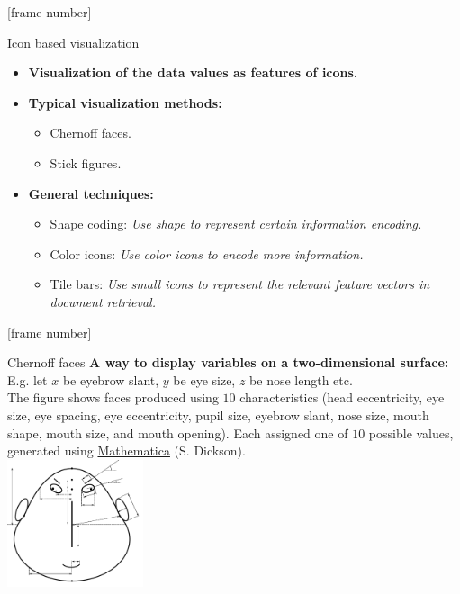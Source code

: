 \documentclass[aspectratio=169,t]{beamer}
\begin{document}
  {
    [frame number]
    \begin{frame}{Icon based visualization}
    \centering
    \begin{itemize}
      \item \textbf{Visualization of the data values as features of icons.}
      \item \textbf{Typical visualization methods:}
      \begin{itemize}
        \item Chernoff faces.
        \item Stick figures.
      \end{itemize}
      \item \textbf{General techniques:}
      \begin{itemize}
        \item Shape coding: \emph{Use shape to represent certain information encoding.}
        \item Color icons: \emph{Use color icons to encode more information.}
        \item Tile bars: \emph{Use small icons to represent the relevant feature vectors in document retrieval.}
      \end{itemize}
    \end{itemize}
    \end{frame}
  }

  {
    [frame number]
    \begin{frame}{Chernoff faces}
    \textbf{A way to display variables on a two-dimensional surface:}\\
    E.g. let $x$ be eyebrow slant, $y$ be eye size, $z$ be nose length etc.\\
    The figure shows faces produced using $10$ characteristics (head eccentricity, eye size, eye spacing, eye eccentricity, pupil size, eyebrow slant, nose size, mouth shape, mouth size, and mouth opening). Each assigned one of $10$ possible values, generated using \href{https://www.wolfram.com/mathematica/}{Mathematica} (S. Dickson).\\[0.5cm]
    \centering
    \includegraphics[width=4cm]{img/chernoff_faces_construction.pdf}
    \end{frame}
  }
\end{document}
